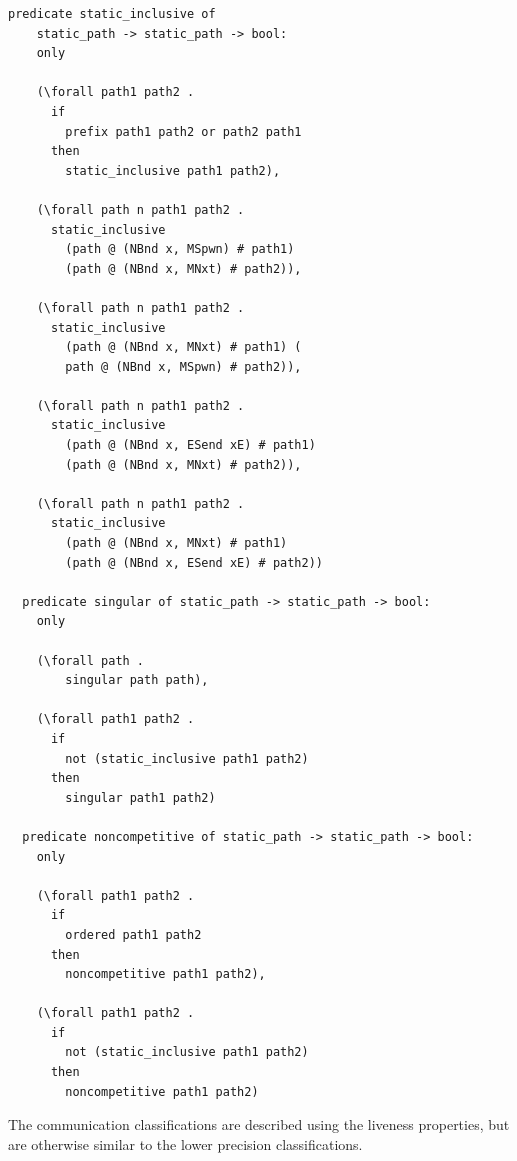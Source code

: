 \documentclass[10pt]{article}
\begin{document}
\begin{lstlisting}[language=logic, mathescape]
  predicate static_inclusive of
    static_path -> static_path -> bool:
    only

    (\forall path1 path2 .
      if
        prefix path1 path2 or path2 path1
      then
        static_inclusive path1 path2),

    (\forall path n path1 path2 .
      static_inclusive
        (path @ (NBnd x, MSpwn) # path1)
        (path @ (NBnd x, MNxt) # path2)),

    (\forall path n path1 path2 .
      static_inclusive
        (path @ (NBnd x, MNxt) # path1) (
        path @ (NBnd x, MSpwn) # path2)),

    (\forall path n path1 path2 .
      static_inclusive
        (path @ (NBnd x, ESend xE) # path1)
        (path @ (NBnd x, MNxt) # path2)),

    (\forall path n path1 path2 .
      static_inclusive
        (path @ (NBnd x, MNxt) # path1)
        (path @ (NBnd x, ESend xE) # path2))

  predicate singular of static_path -> static_path -> bool:
    only 

    (\forall path .
        singular path path),

    (\forall path1 path2 .
      if
        not (static_inclusive path1 path2)
      then
        singular path1 path2)

  predicate noncompetitive of static_path -> static_path -> bool:
    only

    (\forall path1 path2 . 
      if
        ordered path1 path2
      then
        noncompetitive path1 path2),

    (\forall path1 path2 .
      if
        not (static_inclusive path1 path2)
      then
        noncompetitive path1 path2)
  \end{lstlisting}

The communication classifications are described using the liveness properties, but
are otherwise similar to the lower precision classifications.
\end{document}
